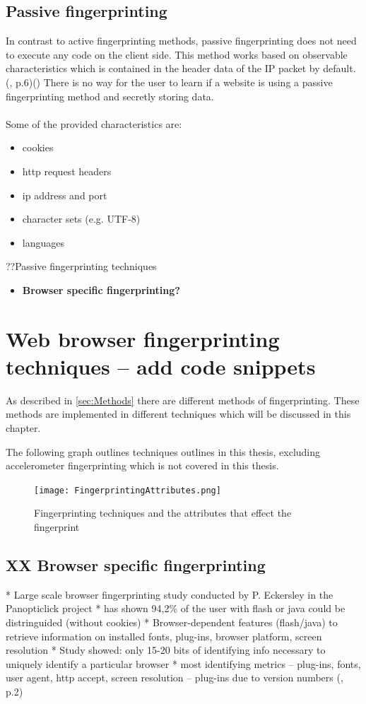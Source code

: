 \subsection{Passive fingerprinting}
In contrast to active fingerprinting methods, passive fingerprinting does not need to execute any code on the client side. This method works based on observable characteristics which is contained in the header data of the IP packet by default. (\textcite{doty18}, p.6)(\textcite{web17}) There is no way for the user to learn if a website is using a passive fingerprinting method and secretly storing data.\\\\
Some of the provided characteristics are:
\begin{itemize}
	\item cookies
	\item http request headers
	\item ip address and port
	\item character sets (e.g. UTF-8)
	\item languages\\
\end{itemize}
??Passive fingerprinting techniques
\begin{itemize}
	\item \textbf{Browser specific fingerprinting?}
\end{itemize}


\section{Web browser fingerprinting techniques -- add code snippets}
As described in \autoref{sec:Methods} there are different methods of fingerprinting. These methods are implemented in different techniques which will be discussed in this chapter.

The following graph outlines techniques outlines in this thesis, excluding accelerometer fingerprinting which is not covered in this thesis.

\begin{figure}[H]
	\centering
	\texttt{[image: FingerprintingAttributes.png]}
	\caption{Fingerprinting techniques and the attributes that effect the fingerprint}
	\label{BrowserSpecification}
\end{figure}
\subsection{XX Browser specific fingerprinting}
%
%
* Large scale browser fingerprinting study conducted by P. Eckersley in the Panopticlick project
* has shown 94,2\% of the user with flash or java could be distringuided (without cookies)
* Browser-dependent features (flash/java) to retrieve information on installed fonts, plug-ins, browser platform, screen resolution
* Study showed: only 15-20 bits of identifying info necessary to uniquely identify a particular browser
* most identifying metrics – plug-ins, fonts, user agent, http accept, screen resolution – plug-ins due to version numbers
(\textcite{upi15}, p.2)

